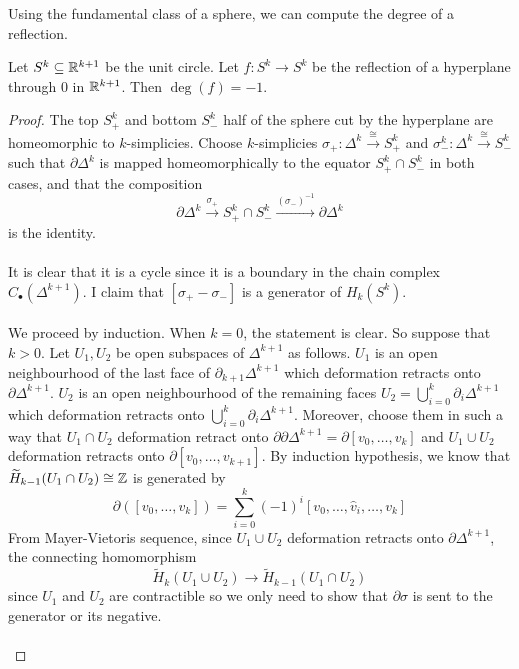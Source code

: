 \documentclass[a4paper]{article}
\begin{document}
Using the fundamental class of a sphere, we can compute the degree of a reflection. 

\begin{lmm}{}{} Let $S^k\subseteq\mathbb{R}^{k+1}$ be the unit circle. Let $f:S^k\to S^k$ be the reflection of a hyperplane through $0$ in $\mathbb{R}^{k+1}$. Then $\deg(f)=-1$. \tcbline
\begin{proof}
The top $S_+^k$ and bottom $S_-^k$ half of the sphere cut by the hyperplane  are homeomorphic to $k$-simplicies. Choose $k$-simplicies $\sigma_+:\Delta^k\overset{\cong}{\longrightarrow}S_+^k$ and $\sigma_-^k:\Delta^k\overset{\cong}{\longrightarrow}S_-^k$ such that $\partial\Delta^k$ is mapped homeomorphically to the equator $S_+^k\cap S_-^k$ in both cases, and that the composition $$\partial\Delta^k\overset{\sigma_+}{\longrightarrow}S_+^k\cap S_-^k\overset{(\sigma_-)^{-1}}{\longrightarrow}\partial\Delta^k$$ is the identity. \\~\\

It is clear that it is a cycle since it is a boundary in the chain complex $C_\bullet(\Delta^{k+1})$. I claim that $[\sigma_+-\sigma_-]$ is a generator of $H_k(S^k)$. \\~\\

We proceed by induction. When $k=0$, the statement is clear. So suppose that $k>0$. Let $U_1,U_2$ be open subspaces of $\Delta^{k+1}$ as follows. $U_1$ is an open neighbourhood of the last face of $\partial_{k+1}\Delta^{k+1}$ which deformation retracts onto $\partial\Delta^{k+1}$. $U_2$ is an open neighbourhood of the remaining faces $U_2=\bigcup_{i=0}^k\partial_i\Delta^{k+1}$ which deformation retracts onto $\bigcup_{i=0}^k\partial_i\Delta^{k+1}$. Moreover, choose them in such a way that $U_1\cap U_2$ deformation retract onto $\partial\partial\Delta^{k+1}=\partial[v_0,\dots,v_k]$ and $U_1\cup U_2$ deformation retracts onto $\partial[v_0,\dots,v_{k+1}]$. By induction hypothesis, we know that $\widetilde{H}_{k-1}(U_1\cap U_2)\cong\mathbb{Z}$ is generated by $$\partial([v_0,\dots,v_k])=\sum_{i=0}^k(-1)^i[v_0,\dots,\hat{v}_i,\dots,v_k]$$ From Mayer-Vietoris sequence, since $U_1\cup U_2$ deformation retracts onto $\partial\Delta^{k+1}$, the connecting homomorphism $$\widetilde{H}_k(U_1\cup U_2)\to\widetilde{H}_{k-1}(U_1\cap U_2)$$ since $U_1$ and $U_2$ are contractible so we only need to show that $\partial\sigma$ is sent to the generator or its negative. \\~\\


\end{proof}
\end{lmm}
\end{document}
